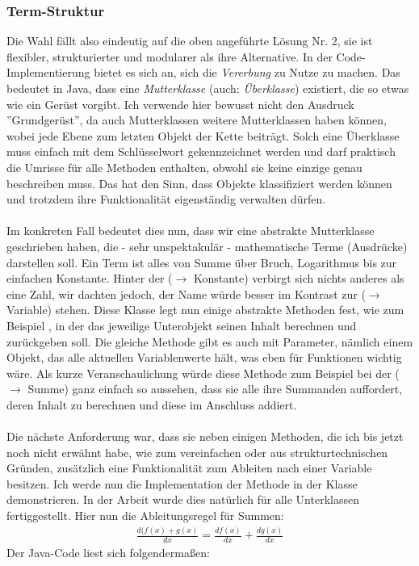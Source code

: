 \subsubsection{Term-Struktur}
Die Wahl fällt also eindeutig auf die oben angeführte Lösung Nr. 2, sie ist flexibler, strukturierter und modularer als ihre Alternative. In der Code-Implementierung bietet es sich an, sich die \textit{Vererbung} zu Nutze zu machen. Das bedeutet in Java, dass eine \textit{Mutterklasse} (auch: \textit{Überklasse}) existiert, die so etwas wie ein Gerüst vorgibt. Ich verwende hier bewusst nicht den Ausdruck ''Grundgerüst'', da auch Mutterklassen weitere Mutterklassen haben können, wobei jede Ebene zum letzten Objekt der Kette beiträgt. Solch eine Überklasse muss einfach mit dem Schlüsselwort  gekennzeichnet werden und darf praktisch die Umrisse für alle Methoden enthalten, obwohl sie keine einzige genau beschreiben muss. Das hat den Sinn, dass Objekte klassifiziert werden können und trotzdem ihre Funktionalität eigenständig verwalten dürfen.\\
\\
Im konkreten Fall bedeutet dies nun, dass wir eine abstrakte Mutterklasse  geschrieben haben, die - sehr unspektakulär - mathematische Terme (Ausdrücke) darstellen soll. Ein Term ist alles von Summe über Bruch, Logarithmus bis zur einfachen Konstante. Hinter der  ($\rightarrow$ Konstante) verbirgt sich nichts anderes als eine Zahl, wir dachten jedoch, der Name würde besser im Kontrast zur  ($\rightarrow$ Variable) stehen. Diese Klasse legt nun einige abstrakte Methoden fest, wie zum Beispiel , in der das jeweilige Unterobjekt seinen Inhalt berechnen und zurückgeben soll. Die gleiche Methode gibt es auch mit Parameter, nämlich einem Objekt, das alle aktuellen Variablenwerte hält, was eben für Funktionen wichtig wäre. Als kurze Veranschaulichung würde diese Methode zum Beispiel bei der  ($\rightarrow$ Summe) ganz einfach so aussehen, dass sie alle ihre Summanden auffordert, deren Inhalt zu berechnen und diese im Anschluss addiert.\\
\\
Die nächste Anforderung war, dass sie neben einigen Methoden, die ich bis jetzt noch nicht erwähnt habe, wie  zum vereinfachen oder  aus strukturtechnischen Gründen, zusätzlich eine Funktionalität zum Ableiten nach einer Variable besitzen. Ich werde nun die Implementation der Methode  in der Klasse  demonstrieren. In der Arbeit wurde dies natürlich für alle Unterklassen fertiggestellt. Hier nun die Ableitungsregel für Summen:
\begin{gather*}
\frac{d(f(x)+g(x)}{dx} = \frac{d f(x)}{dx}+\frac{d g(x)}{dx}
\end{gather*}
Der Java-Code liest sich folgendermaßen:\\

